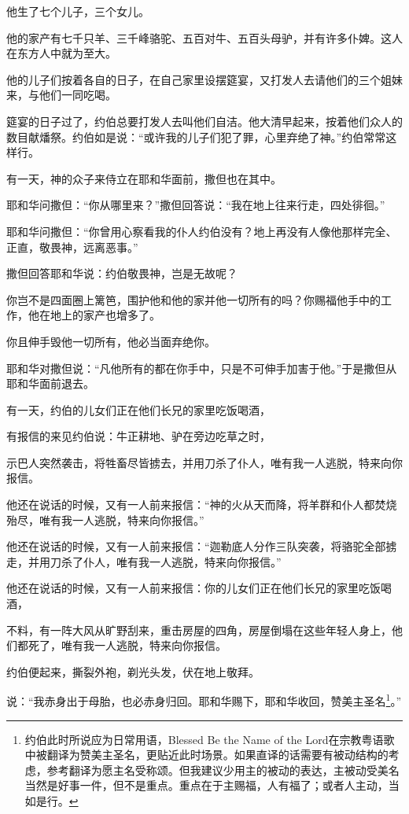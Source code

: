 \documentclass[12pt,oneside]{book}
\begin{document}
他生了七个儿子，三个女儿。

他的家产有七千只羊、三千峰骆驼、五百对牛、五百头母驴，并有许多仆婢。这人在东方人中就为至大。

他的儿子们按着各自的日子，在自己家里设摆筵宴，又打发人去请他们的三个姐妹来，与他们一同吃喝。

筵宴的日子过了，约伯总要打发人去叫他们自洁。他大清早起来，按着他们众人的数目献燔祭。约伯如是说：“或许我的儿子们犯了罪，心里弃绝了神。”约伯常常这样行。

有一天，神的众子来侍立在耶和华面前，撒但也在其中。

耶和华问撒但：“你从哪里来？”撒但回答说：“我在地上往来行走，四处徘徊。”

耶和华问撒但：“你曾用心察看我的仆人约伯没有？地上再没有人像他那样完全、正直，敬畏神，远离恶事。”

撒但回答耶和华说：约伯敬畏神，岂是无故呢？

你岂不是四面圈上篱笆，围护他和他的家并他一切所有的吗？你赐福他手中的工作，他在地上的家产也增多了。

你且伸手毁他一切所有，他必当面弃绝你。

耶和华对撒但说：“凡他所有的都在你手中，只是不可伸手加害于他。”于是撒但从耶和华面前退去。

有一天，约伯的儿女们正在他们长兄的家里吃饭喝酒，

有报信的来见约伯说：牛正耕地、驴在旁边吃草之时，

示巴人突然袭击，将牲畜尽皆掳去，并用刀杀了仆人，唯有我一人逃脱，特来向你报信。

他还在说话的时候，又有一人前来报信：“神的火从天而降，将羊群和仆人都焚烧殆尽，唯有我一人逃脱，特来向你报信。”

他还在说话的时候，又有一人前来报信：“迦勒底人分作三队突袭，将骆驼全部掳走，并用刀杀了仆人，唯有我一人逃脱，特来向你报信。”

他还在说话的时候，又有一人前来报信：你的儿女们正在他们长兄的家里吃饭喝酒，

不料，有一阵大风从旷野刮来，重击房屋的四角，房屋倒塌在这些年轻人身上，他们都死了，唯有我一人逃脱，特来向你报信。

约伯便起来，撕裂外袍，剃光头发，伏在地上敬拜。

说：“我赤身出于母胎，也必赤身归回。耶和华赐下，耶和华收回，赞美主圣名\footnote{约伯此时所说应为日常用语，Blessed Be the Name of the Lord在宗教粤语歌中被翻译为赞美主圣名，更贴近此时场景。如果直译的话需要有被动结构的考虑，参考翻译为愿主名受称颂。但我建议少用主的被动的表达，主被动受美名当然是好事一件，但不是重点。重点在于主赐福，人有福了；或者人主动，当如是行。}。”
\end{document}
